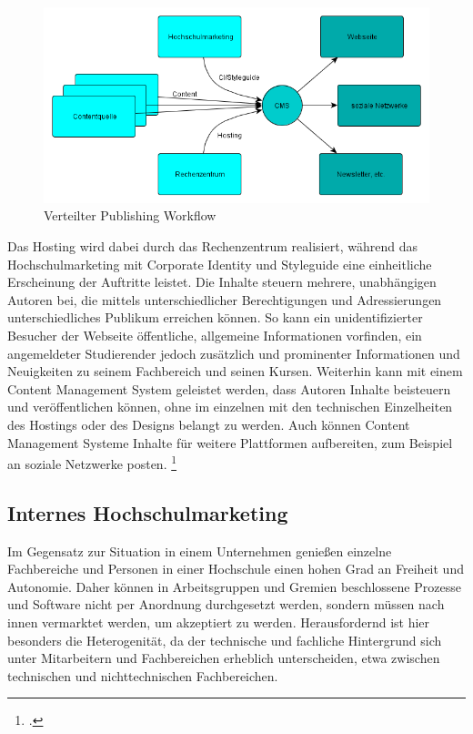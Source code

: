 \begin{figure}[h!]
	\centering
	\includegraphics[width=\textwidth]
	{kapitel/gruppe3/bilder/verteilter_publishing_workflow}
	\caption{Verteilter Publishing Workflow}
	\label{fig_publishing_workflow}
\end{figure}

Das Hosting wird dabei durch das Rechenzentrum realisiert, während das Hochschulmarketing mit Corporate Identity und Styleguide eine einheitliche Erscheinung der Auftritte leistet. Die Inhalte steuern mehrere, unabhängigen Autoren bei, die mittels unterschiedlicher Berechtigungen und Adressierungen unterschiedliches Publikum erreichen können.
So kann ein unidentifizierter Besucher der Webseite öffentliche, allgemeine Informationen vorfinden, ein angemeldeter Studierender jedoch zusätzlich und prominenter Informationen und Neuigkeiten zu seinem Fachbereich und seinen Kursen.
Weiterhin kann mit einem Content Management System geleistet werden, dass Autoren Inhalte beisteuern und veröffentlichen können, ohne im einzelnen mit den technischen Einzelheiten des Hostings oder des Designs belangt zu werden. Auch können Content Management Systeme Inhalte für weitere Plattformen aufbereiten, zum Beispiel an soziale Netzwerke posten. \footcite[Vgl.][]{content_management_system_patent}

\subsection{Internes Hochschulmarketing}
\label{subsection_internes_hochschulemarketing}
Im Gegensatz zur Situation in einem Unternehmen genießen einzelne Fachbereiche und Personen in einer Hochschule einen hohen Grad an Freiheit und Autonomie. Daher können in Arbeitsgruppen und Gremien beschlossene Prozesse und Software nicht per Anordnung durchgesetzt werden, sondern müssen nach innen vermarktet werden, um akzeptiert zu werden. Herausfordernd ist hier besonders die Heterogenität, da der technische und fachliche Hintergrund sich unter Mitarbeitern und Fachbereichen erheblich unterscheiden, etwa zwischen technischen und nichttechnischen Fachbereichen.

